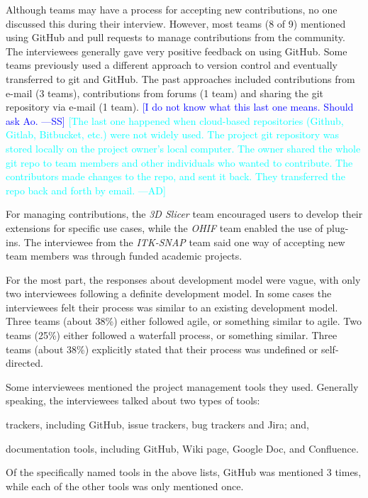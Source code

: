 \documentclass[final, 3p, times, authoryear]{elsarticle}
\newcommand{\authornote}[3]{\textcolor{#1}{[#3 ---#2]}}
\newcommand{\authornote}[3]{}
\newcommand{\wss}[1]{\authornote{blue}{SS}{#1}} %
\newcommand{\ad}[1]{\authornote{cyan}{AD}{#1}} %
\begin{document}
Although teams may have a process for accepting new contributions, no one
discussed this during their interview. However, most teams (8 of 9) mentioned
using GitHub and pull requests to manage contributions from the community. The
interviewees generally gave very positive feedback on using GitHub. Some teams
previously used a different approach to version control and eventually
transferred to git and GitHub.  The past approaches included contributions
from e-mail (3 teams), contributions from forums (1 team) and sharing the
git repository via e-mail (1 team).  \wss{I do not know what this last one means.
Should ask Ao.} \ad{The last one happened when cloud-based repositories (Github,
Gitlab, Bitbucket, etc.) were not widely used. The project git repository was
stored locally on the project owner's local computer. The owner shared the whole
git repo to team members and other individuals who wanted to contribute. The
contributors made changes to the repo, and sent it back. They transferred the
repo back and forth by email.}

For managing contributions, the \textit{3D Slicer} team encouraged users to
develop their extensions for specific use cases, while the \textit{OHIF} team
enabled the use of plug-ins.  The interviewee from the \textit{ITK-SNAP} team
said one way of accepting new team members was through funded academic projects.

For the most part, the responses about development model were vague, with only
two interviewees following a definite development model. In some cases the
interviewees felt their process was similar to an existing development model.
Three teams (about 38\%) either followed agile, or something similar to agile.
Two teams (25\%) either followed a waterfall process, or something similar.
Three teams (about 38\%) explicitly stated that their process was undefined or
self-directed.

Some interviewees mentioned the project management tools they used. Generally
speaking, the interviewees talked about two types of tools:
\begin{inparaenum}[i)]
\item trackers, including GitHub, issue trackers, bug trackers and Jira; and,
\item documentation tools, including GitHub, Wiki page, Google Doc, and Confluence.
\end{inparaenum}
Of the specifically named tools in the above lists, GitHub was mentioned 3
times, while each of the other tools was only mentioned once.
\end{document}

